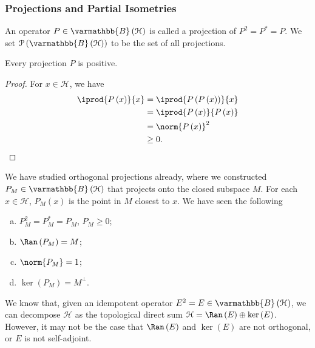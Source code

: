 \documentclass[10pt]{mypackage}
\renewcommand*{\mathbb}[1]{\varmathbb{#1}}
\newcommand{\B}{\mathbb{B}}
\begin{document}
\subsubsection{Projections and Partial Isometries}%
An operator $P\in \B\left(\mathcal{H}\right)$ is called a projection of $P^2 = P^{\ast} = P$. We set $\mathcal{P}\left(\B\left(\mathcal{H}\right)\right)$ to be the set of all projections.
\begin{fact}
  Every projection $P$ is positive.
\end{fact}
\begin{proof}
  For $x\in \mathcal{H}$, we have
  \begin{align*}
    \iprod{P\left(x\right)}{x} &= \iprod{P\left(P\left(x\right)\right)}{x}\\
                               &= \iprod{P\left(x\right)}{P\left(x\right)}\\
                               &= \norm{P\left(x\right)}^2\\
                               &\geq 0.
  \end{align*}
\end{proof}
We have studied orthogonal projections already, where we constructed $P_M\in \B\left(\mathcal{H}\right)$ that projects onto the closed subspace $M$. For each $x\in \mathcal{H}$, $P_M\left(x\right)$ is the point in $M$ closest to $x$. We have seen the following
\begin{enumerate}[(a)]
  \item $P_M^2 = P_M^{\ast} = P_M$, $P_M \geq 0$;
  \item $\Ran\left(P_M\right) = M$;
  \item $\norm{P_M} = 1$;
  \item $\ker\left(P_M\right) = M^{\perp}$.
\end{enumerate}
We know that, given an idempotent operator $E^2 = E \in \B\left(\mathcal{H}\right)$, we can decompose $\mathcal{H}$ as the topological direct sum $\mathcal{H} = \Ran\left(E\right) \oplus \ker\left(E\right)$. However, it may not be the case that $\Ran\left(E\right)$ and $\ker\left(E\right)$ are not orthogonal, or $E$ is not self-adjoint.\newline
\end{document}
